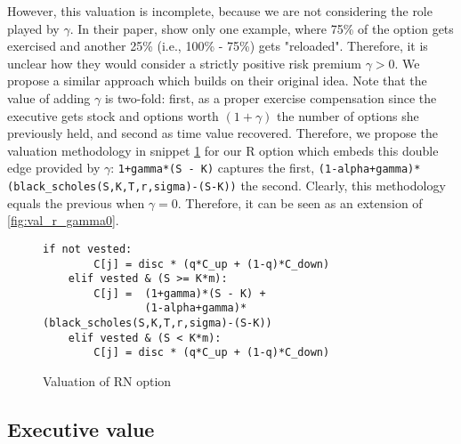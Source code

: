  

However, this valuation is incomplete, because we are not considering the role played by $\gamma$. In their paper, \cite{huang2013dynamic} show only one example, where 75\% of the option gets exercised and another 25\% (i.e., 100\% - 75\%) gets "reloaded". Therefore, it is unclear how they would consider a strictly positive risk premium $\gamma > 0$. 
We propose a similar approach which builds on their original idea. Note that the value of adding $\gamma$ is two-fold: first, as a proper exercise compensation since the executive gets stock and options worth $(1+\gamma)$ the number of options she previously held, and second as time value recovered. Therefore, we propose the valuation methodology in snippet \ref*{fig:val_r} for our R option which embeds this double edge provided by $\gamma$: \verb|1+gamma*(S - K)| captures the first, \verb|(1-alpha+gamma)*(black_scholes(S,K,T,r,sigma)-(S-K))| the second.
Clearly, this methodology equals the previous when $\gamma = 0$. Therefore, it can be seen as an extension of \ref*{fig:val_r_gamma0}.

\begin{figure}
    \begin{lstlisting}[breaklines, basicstyle=\ttfamily\small] 
    if not vested:                         
        C[j] = disc * (q*C_up + (1-q)*C_down)
    elif vested & (S >= K*m):                
        C[j] =  (1+gamma)*(S - K) + 
                (1-alpha+gamma)*(black_scholes(S,K,T,r,sigma)-(S-K))
    elif vested & (S < K*m):  
        C[j] = disc * (q*C_up + (1-q)*C_down)
    \end{lstlisting}
    \caption{Valuation of RN option}
    \label{fig:val_r}
\end{figure}



\subsection{Executive value}



